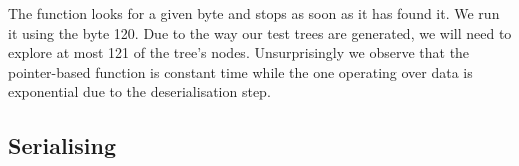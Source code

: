 The  function looks for a given byte and stops
as soon as it has found it. We run it using the byte 120.
%
Due to the way our test trees are generated, we will need to explore
at most 121 of the tree's nodes.
%
Unsurprisingly we observe that the pointer-based function is
constant time while the one operating over data is exponential
due to the deserialisation step.

\noindent
\begin{minipage}{.5\textwidth}
\end{minipage}\hfill
\begin{minipage}{.45\textwidth}
\end{minipage}



\subsection{Serialising}

\noindent
\begin{minipage}{.5\textwidth}
\end{minipage}\hfill
\begin{minipage}{.45\textwidth}
\end{minipage}
